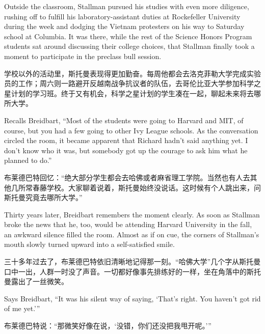 \ifdefined\eng
Outside the classroom, Stallman pursued his studies with even more diligence, rushing off to fulfill his laboratory-assistant duties at Rockefeller University during the week and dodging the Vietnam protesters on his way to Saturday school at Columbia. It was there, while the rest of the Science Honors Program students sat around discussing their college choices, that Stallman finally took a moment to participate in the preclass bull session.
\fi

\ifdefined\chs
学校以外的活动里，斯托曼表现得更加勤奋。每周他都会去洛克菲勒大学完成实验员的工作；周六则一路避开反越南战争抗议者的队伍，去哥伦比亚大学参加科学之星计划的学习班。终于又有机会，科学之星计划的学生凑在一起，聊起未来将去哪所大学。
\fi

\ifdefined\eng
Recalls Breidbart, ``Most of the students were going to Harvard and MIT, of course, but you had a few going to other Ivy League schools. As the conversation circled the room, it became apparent that Richard hadn't said anything yet. I don't know who it was, but somebody got up the courage to ask him what he planned to do.''
\fi

\ifdefined\chs
布莱德巴特回忆：``绝大部分学生都会去哈佛或者麻省理工学院。当然也有人去其他几所常春藤学校。大家聊着说着，斯托曼始终没说话。这时候有个人跳出来，问斯托曼究竟去哪所大学。''
\fi

\ifdefined\eng
Thirty years later, Breidbart remembers the moment clearly. As soon as Stallman broke the news that he, too, would be attending Harvard University in the fall, an awkward silence filled the room. Almost as if on cue, the corners of Stallman's mouth slowly turned upward into a self-satisfied smile.
\fi

\ifdefined\chs
三十多年过去了，布莱德巴特依旧清晰地记得那一刻。``哈佛大学''几个字从斯托曼口中一出，人群一时没了声音。一切都好像事先排练好的一样，坐在角落中的斯托曼露出了一丝微笑。
\fi

\ifdefined\eng
Says Breidbart, ``It was his silent way of saying, `That's right. You haven't got rid of me yet.'\hspace{0.01in}''
\fi

\ifdefined\chs
布莱德巴特说：``那微笑好像在说，`没错，你们还没把我甩开呢。'\hspace{0.01in}''
\fi

\theendnotes
\setcounter{endnote}{0}
